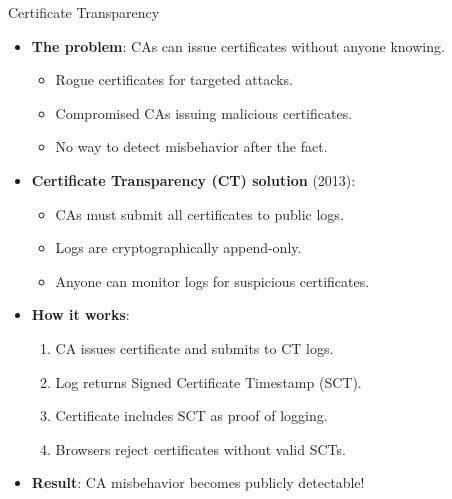 \ifdefined\PRESENTATION\else\PassOptionsToClass{handout}{beamer}\fi\documentclass[aspectratio=169, lualatex]{beamer}
\begin{document}
\begin{frame}{Certificate Transparency}
	\begin{itemize}[<+->]
		\item \textbf{The problem}: CAs can issue certificates without anyone knowing.
		      \begin{itemize}
			      \item Rogue certificates for targeted attacks.
			      \item Compromised CAs issuing malicious certificates.
			      \item No way to detect misbehavior after the fact.
		      \end{itemize}
		\item \textbf{Certificate Transparency (CT) solution} (2013):
		      \begin{itemize}
			      \item CAs must submit all certificates to public logs.
			      \item Logs are cryptographically append-only.
			      \item Anyone can monitor logs for suspicious certificates.
		      \end{itemize}
		\item \textbf{How it works}:
		      \begin{enumerate}
			      \item CA issues certificate and submits to CT logs.
			      \item Log returns Signed Certificate Timestamp (SCT).
			      \item Certificate includes SCT as proof of logging.
			      \item Browsers reject certificates without valid SCTs.
		      \end{enumerate}
		\item \textbf{Result}: CA misbehavior becomes publicly detectable!
	\end{itemize}
\end{frame}
\end{document}
